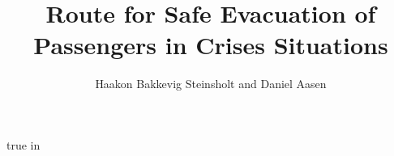 \documentclass[12pt,letterpaper,final]{report}
\author{Haakon Bakkevig Steinsholt and Daniel Aasen}
\title{Route for Safe Evacuation of Passengers in Crises Situations}
\theoremstyle{definition}
\begin{document}
    \maketitle

    \newpage    

    \tableofcontents
    \listoffigures

     true in

    \newpage

        
                
    
    
    

    \begin{singlespace}
        
        
    \end{singlespace}

    \printglossary   
\end{document}
